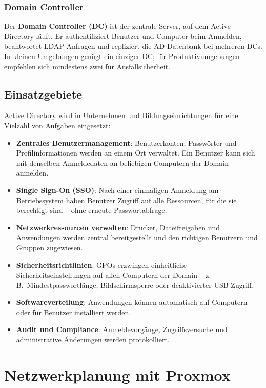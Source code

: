 \documentclass[11pt, oneside, numbers=noenddot]{scrbook}
\begin{document}
\subsection{Domain Controller}
Der \textbf{Domain Controller (DC)} ist der zentrale Server, auf dem Active Directory läuft. Er authentifiziert Benutzer und Computer beim Anmelden, beantwortet LDAP-Anfragen und repliziert die AD-Datenbank bei mehreren DCs. In kleinen Umgebungen genügt ein einziger DC; für Produktivumgebungen empfehlen sich mindestens zwei für Ausfallsicherheit.

\section{Einsatzgebiete}
Active Directory wird in Unternehmen und Bildungseinrichtungen für eine Vielzahl von Aufgaben eingesetzt:

\begin{itemize}
  \item \textbf{Zentrales Benutzermanagement}: Benutzerkonten, Passwörter und Profilinformationen werden an einem Ort verwaltet. Ein Benutzer kann sich mit denselben Anmeldedaten an beliebigen Computern der Domain anmelden.
  \item \textbf{Single Sign-On (SSO)}: Nach einer einmaligen Anmeldung am Betriebssystem haben Benutzer Zugriff auf alle Ressourcen, für die sie berechtigt sind -- ohne erneute Passwortabfrage.
  \item \textbf{Netzwerkressourcen verwalten}: Drucker, Dateifreigaben und Anwendungen werden zentral bereitgestellt und den richtigen Benutzern und Gruppen zugewiesen.
  \item \textbf{Sicherheitsrichtlinien}: GPOs erzwingen einheitliche Sicherheitseinstellungen auf allen Computern der Domain -- z.\,B.\ Mindestpasswortlänge, Bildschirmsperre oder deaktivierter USB-Zugriff.
  \item \textbf{Softwareverteilung}: Anwendungen können automatisch auf Computern oder für Benutzer installiert werden.
  \item \textbf{Audit und Compliance}: Anmeldevorgänge, Zugriffsversuche und administrative Änderungen werden protokolliert.
\end{itemize}



\chapter{Netzwerkplanung mit Proxmox}
\end{document}
